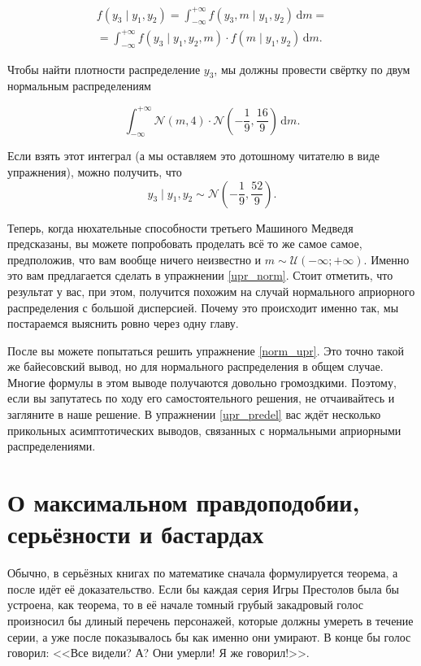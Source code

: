 \documentclass[12pt, a4paper, oneside]{extreport}
\def \mN{\mathcal{N}}
\def \mU{\mathcal{U}}
\newcommand{\dx}[1]{\,\mathrm{d}#1} %
\theoremstyle{plain}              %
\theoremstyle{definition}         %
\begin{document}

\begin{multline*}
 f(y_3 \mid y_1,y_2)  = \int_{-\infty}^{+\infty} f(y_3, m \mid y_1,y_2)\dx{m} = \\ = \int_{-\infty}^{+\infty}  f(y_3 \mid y_1,y_2,m) \cdot f(m \mid y_1,y_2) \dx{m}.
\end{multline*}

Чтобы найти плотности распределение $y_3$, мы должны провести свёртку по двум нормальным распределениям

\[ \int_{-\infty}^{+\infty} \mN(m,4)\cdot \mN \left (-\frac{1}{9},\frac{16}{9} \right)\dx{m}.\]  

Если взять этот интеграл (а мы оставляем это дотошному читателю в виде упражнения),  можно получить, что \[y_3 \mid y_1,y_2 \sim \mN \left(-\frac{1}{9},\frac{52}{9} \right).\]

Теперь, когда нюхательные способности третьего Машиного Медведя предсказаны, вы можете попробовать проделать всё то же самое самое, предположив, что вам вообще ничего неизвестно и $m \sim \mU(-\infty; +\infty)$. Именно это вам предлагается сделать в упражнении \ref{upr_norm}. Стоит отметить, что результат у вас, при этом, получится похожим на случай нормального априорного распределения с большой дисперсией. Почему это происходит именно так, мы постараемся выяснить ровно через одну главу.

После вы можете попытаться решить упражнение \ref{norm_upr}. Это точно такой же байесовский вывод, но для нормального распределения в общем случае. Многие формулы в этом выводе получаются довольно громоздкими. Поэтому, если вы запутатесь по ходу его самостоятельного решения, не отчаивайтесь и загляните в наше решение. В упражнении \ref{upr_predel} вас ждёт несколько прикольных асимптотических выводов, связанных с нормальными априорными распределениями. 



\section{О максимальном правдоподобии, серьёзности и бастардах}


Обычно, в серьёзных книгах по математике сначала формулируется теорема, а после идёт её доказательство. Если бы каждая серия Игры Престолов была бы устроена, как теорема, то в её начале томный грубый закадровый голос произносил бы длиный перечень персонажей, которые должны умереть в течение серии, а уже после показывалось бы как именно они умирают. В конце бы голос говорил: <<Все видели? А? Они умерли! Я же говорил!>>.
\end{document}
